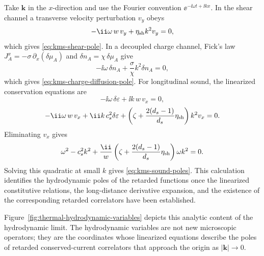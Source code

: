 Take \(\mathbf k\) in the \(x\)-direction and use the Fourier convention
\(\ee^{-\ii\omega t+\ii kx}\).  In the shear channel a transverse velocity
perturbation \(v_y\) obeys
\[
  -\ii\omega\,w\,v_y+\eta_{\rm sh}k^2v_y=0,
\]
which gives \eqref{eq:kms-shear-pole}.  In a decoupled charge channel,
Fick's law \(J_A^x=-\sigma\,\partial_x(\delta\mu_A)\) and
\(\delta n_A=\chi\,\delta\mu_A\) give
\[
  -\ii\omega\,\delta n_A+\frac{\sigma}{\chi}k^2\delta n_A=0,
\]
which gives \eqref{eq:kms-charge-diffusion-pole}.  For longitudinal sound,
the linearized conservation equations are
\[
  -\ii\omega\,\delta\varepsilon+\ii k\,w\,v_x=0,
\]
\[
  -\ii\omega\,w\,v_x+\ii k\,c_s^2\delta\varepsilon
  +
  \left(\zeta+\frac{2(d_s-1)}{d_s}\eta_{\rm sh}\right)k^2v_x=0 .
\]
Eliminating \(v_x\) gives
\[
  \omega^2-c_s^2k^2
  +
  \frac{\ii}{w}
  \left(\zeta+\frac{2(d_s-1)}{d_s}\eta_{\rm sh}\right)
  \omega k^2=0 .
\]
Solving this quadratic at small \(k\) gives \eqref{eq:kms-sound-poles}.
This calculation identifies the hydrodynamic poles of the retarded functions
once the linearized constitutive relations, the long-distance derivative
expansion, and the existence of the corresponding retarded correlators have
been established.

Figure~\ref{fig:thermal-hydrodynamic-variables} depicts this analytic
content of the hydrodynamic limit.  The hydrodynamic variables are not new
microscopic operators; they are the coordinates whose linearized equations
describe the poles of retarded conserved-current correlators that approach
the origin as \(|\mathbf k|\to0\).

